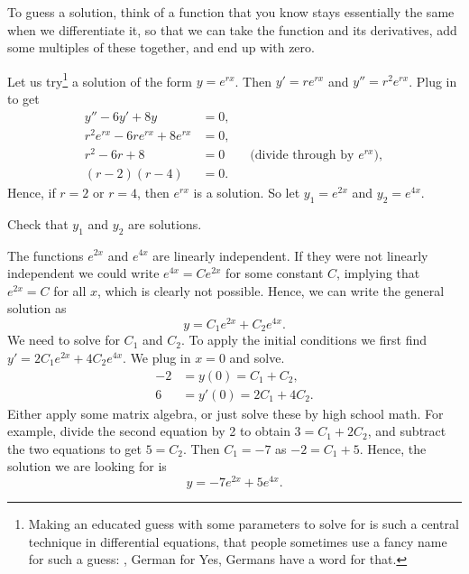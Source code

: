 To guess a solution, think of a function that you know stays essentially the
same when we differentiate it, so that we can take the function and its
derivatives, add some multiples of these together, and end up with zero.

Let us try\footnote{%
Making an educated guess with some parameters to solve for 
is such a central technique in differential equations, that people sometimes use
a fancy name for such a guess: \emph{}, German for   Yes, Germans have a word for that.}
a solution of the form $y = e^{rx}$.  Then $y' = r e^{rx}$ and
$y'' = r^2 e^{rx}$.  Plug in to get
\begin{align*}
y''-6y'+8y & = 0 , \\
r^2 e^{rx} -6 r e^{rx}+8 e^{rx} & = 0 , \\
r^2 -6 r +8 & = 0 \qquad \text{(divide through by } e^{rx} \text{)},\\
(r-2)(r-4) & = 0 .
\end{align*}
Hence, if $r=2$ or $r=4$, then $e^{rx}$ is a solution.  So let $y_1 = e^{2x}$
and $y_2 = e^{4x}$.

\begin{exercise}
Check that $y_1$ and $y_2$ are solutions.
\end{exercise}

The functions $e^{2x}$ and $e^{4x}$ are linearly independent.  If they
were not linearly independent we could write $e^{4x} = C e^{2x}$ for
some constant $C$,
implying that $e^{2x} = C$ for all $x$, which is clearly not possible. 
Hence, we can write the general solution as
\begin{equation*}
y = C_1 e^{2x} + C_2 e^{4x} .
\end{equation*}
We need to solve for $C_1$ and $C_2$.  To apply the initial conditions
we first find $y' = 2 C_1 e^{2x} + 4 C_2 e^{4x}$.  We plug in $x=0$ and
solve.
\begin{align*}
-2 & = y(0) = C_1 + C_2 , \\
6 & = y'(0) = 2 C_1 + 4 C_2 .
\end{align*}
Either apply some matrix algebra, or just solve these by high school
math.  For example, divide the second equation by 2
to obtain $3 = C_1 + 2 C_2$, and subtract the two equations to
get $5 = C_2$.  Then $C_1 = -7$ as $-2 = C_1 + 5$.  Hence, the solution we
are
looking for is
\begin{equation*}
y = -7 e^{2x} + 5 e^{4x} .
\end{equation*}

